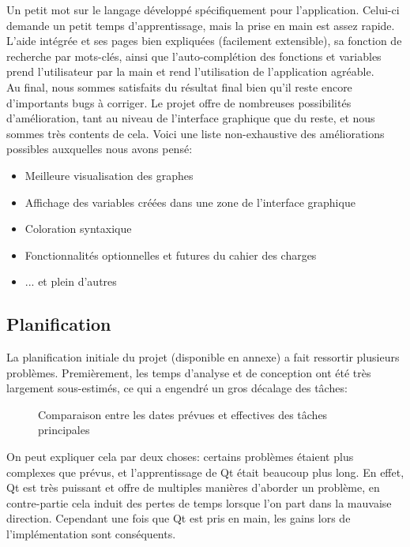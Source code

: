 \documentclass[french]{article}
\begin{document}
		Un petit mot sur le langage développé spécifiquement pour l'application. Celui-ci demande un petit temps d'apprentissage, mais la prise en main est assez rapide. L'aide intégrée et ses pages bien expliquées (facilement extensible), sa fonction de recherche par mots-clés, ainsi que l'auto-complétion des fonctions et variables prend l'utilisateur par la main et rend l'utilisation de l'application agréable.\\  
		
		Au final, nous sommes satisfaits du résultat final bien qu'il reste encore d'importants bugs à corriger. Le projet offre de nombreuses possibilités d'amélioration, tant au niveau de l'interface graphique que du reste, et nous sommes très contents de cela. Voici une liste non-exhaustive des améliorations possibles auxquelles nous avons pensé:
		\begin{itemize}
			\item Meilleure visualisation des graphes
			\item Affichage des variables créées dans une zone de l'interface graphique
			\item Coloration syntaxique
			\item Fonctionnalités optionnelles et futures du cahier des charges
			\item ... et plein d'autres
		\end{itemize}
		
		\subsection{Planification}
		
		La planification initiale du projet (disponible en annexe) a fait ressortir plusieurs problèmes. Premièrement, les temps d'analyse et de conception ont été très largement sous-estimés, ce qui a engendré un gros décalage des tâches:
		\begin{figure}[H]
			
			\caption{Comparaison entre les dates prévues et effectives des tâches principales}
			\label{fig:comparaisondates}
		\end{figure}
		On peut expliquer cela par deux choses: certains problèmes étaient plus complexes que prévus, et l'apprentissage de Qt était beaucoup plus long. En effet, Qt est très puissant et offre de multiples manières d'aborder un problème, en contre-partie cela induit des pertes de temps lorsque l'on part dans la mauvaise direction. Cependant une fois que Qt est pris en main, les gains lors de l'implémentation sont conséquents.\\ 
		
\end{document}

